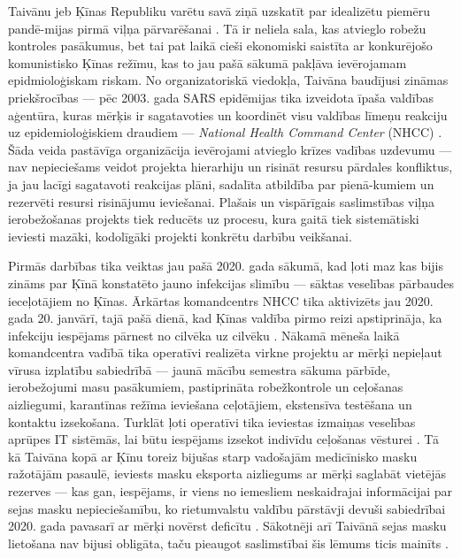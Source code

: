\documentclass[12pt, a4paper]{article}
\numberwithin{equation}{section} %
\begin{document}
Taivānu jeb Ķīnas Republiku varētu savā ziņā uzskatīt par idealizētu piemēru pandē-mijas pirmā viļņa pārvarēšanai \cite{Taiwan_wave_1}. Tā ir neliela sala, kas atvieglo robežu kontroles pasākumus, bet tai pat laikā cieši ekonomiski saistīta ar konkurējošo komunistisko Ķīnas režīmu, kas to jau pašā sākumā pakļāva ievērojamam epidmioloģiskam riskam. No organizatoriskā viedokļa, Taivāna baudījusi zināmas priekšrocības --- pēc 2003. gada SARS epidēmijas tika izveidota īpaša valdības aģentūra, kuras mērķis ir sagatavoties un koordinēt visu valdības līmeņu reakciju uz epidemioloģiskiem draudiem --- \textit{National Health Command Center} (NHCC) \cite{wang2020response}. Šāda veida pastāvīga organizācija ievērojami atvieglo krīzes vadības uzdevumu --- nav nepieciešams veidot projekta hierarhiju un risināt resursu pārdales konfliktus, ja jau lacīgi sagatavoti reakcijas plāni, sadalīta atbildība par pienā-kumiem un rezervēti resursi risinājumu ieviešanai. Plašais un vispārīgais saslimstības viļņa ierobežošanas projekts tiek reducēts uz procesu, kura gaitā tiek sistemātiski ieviesti mazāki, kodolīgāki projekti konkrētu darbību veikšanai. 

Pirmās darbības tika veiktas jau pašā 2020. gada sākumā, kad ļoti maz kas bijis zināms par Ķīnā konstatēto jauno infekcijas slimību --- sāktas veselības pārbaudes ieceļotājiem no Ķīnas. Ārkārtas komandcentrs NHCC tika aktivizēts jau 2020. gada 20. janvārī, tajā pašā dienā, kad Ķīnas valdība pirmo reizi apstiprināja, ka infekciju iespējams pārnest no cilvēka uz cilvēku \cite{human_human}. Nākamā mēneša laikā komandcentra vadībā tika operatīvi realizēta virkne projektu ar mērķi nepieļaut vīrusa izplatību sabiedrībā --- jaunā mācību semestra sākuma pārbīde, ierobežojumi masu pasākumiem, pastiprināta robežkontrole un ceļošanas aizliegumi, karantīnas režīma ieviešana ceļotājiem, ekstensīva testēšana un kontaktu izsekošana. Turklāt ļoti operatīvi tika ieviestas izmaiņas veselības aprūpes IT sistēmās, lai būtu iespējams izsekot indivīdu ceļošanas vēsturei \cite{wang2020response}. Tā kā Taivāna kopā ar Ķīnu toreiz bijušas starp vadošajām medicīnisko masku ražotājām pasaulē, ieviests masku eksporta aizliegums ar mērķi saglabāt vietējās rezerves \cite{export_ban} --- kas gan, iespējams, ir viens no iemesliem neskaidrajai informācijai par sejas masku nepieciešamību, ko rietumvalstu valdību pārstāvji devuši sabiedrībai 2020. gada pavasarī ar mērķi novērst deficītu \cite{backfired}. Sākotnēji arī Taivānā sejas masku lietošana nav bijusi obligāta, taču pieaugot saslimstībai šis lēmums ticis mainīts \cite{taiwan_mask}. 
\end{document}

